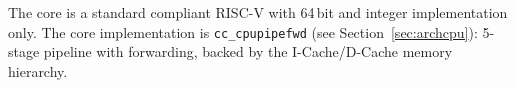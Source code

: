 The core is a standard compliant RISC-V with 64\,bit and integer implementation only.
The core implementation is \texttt{cc\_cpupipefwd} (see Section~\ref{sec:archcpu}):
5-stage pipeline with forwarding, backed by the I-Cache/D-Cache memory hierarchy.
